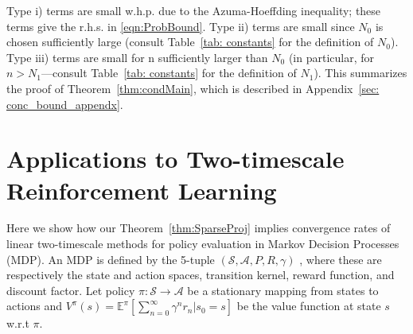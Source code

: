 \documentclass[usenames,dvipsnames,final,12pt]{colt2018} %
\newcommand{\gal}[1]{#1}
\begin{document}
{
Type i) terms are small w.h.p. due to
the Azuma-Hoeffding inequality; these terms give the r.h.s. in \eqref{eqn:ProbBound}. Type ii) terms are small since $N_0$ is chosen sufficiently large (consult Table~\ref{tab: constants} for the definition of $N_0$). Type iii) terms are small for \gal{n sufficiently larger than} $N_0$ (in particular, for $n>N_1$---consult Table~\ref{tab: constants} for the definition of $N_1$).
This summarizes the proof of \gal{Theorem}~\ref{thm:condMain}, which is described in Appendix~\ref{sec: conc_bound_appendx}.





\section{Applications to Two-timescale Reinforcement Learning}
\label{sec:Appl}
Here we show how our Theorem~\ref{thm:SparseProj} implies convergence rates of linear two-timescale methods for policy evaluation in Markov Decision Processes (MDP). An MDP is defined by the 5-tuple $(\mathcal{S}, \mathcal{A},P,R,\gamma)$ \citep{sutton1988learning}, \gal{where these are respectively the state and action spaces, transition kernel, reward function, and discount factor.}
 Let policy $\pi:{\mathcal S} \rightarrow {\mathcal A}$ be a stationary mapping from states to actions and $V^\pi(s) = \mathbb{E}^\pi[\sum_{n=0}^\infty\gamma^nr_n|s_0 = s]$ be the value function at state $s$ w.r.t $\pi$.

}
\end{document}
